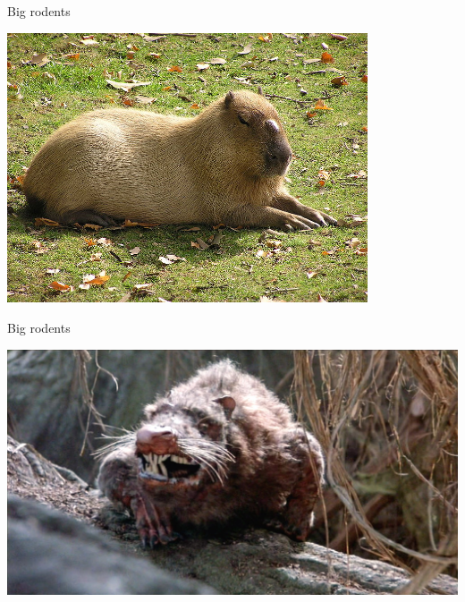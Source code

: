 \documentclass[12pt]{article}
\newcommand{\headsize}{\fontsize{35}{35} \selectfont}
\begin{document}
\newpage

\headsize \color{myyellow}
\hfill \begin{minipage}{5.75in}
\centering
Big rodents
\end{minipage}

\vspace{10mm}

\centerline{\includegraphics[width=0.8\textwidth]{Figs/capybara.jpg}}




\newpage

\addtocounter{page}{-1}

\headsize \color{myyellow}
\hfill \begin{minipage}{5.75in}
\centering
Big rodents
\end{minipage}

\vspace{10mm}

\centerline{\includegraphics[width=\textwidth]{Figs/rodents_of_unusual_size.jpg}}




\newpage
\end{document}
